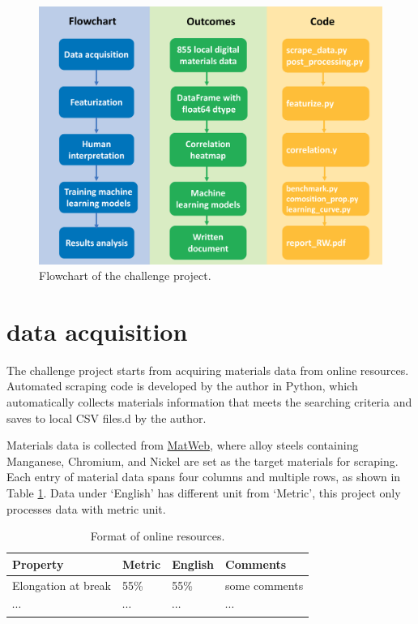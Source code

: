 \documentclass[10pt,aps,prb,amsmath,amssymb,twocolumn,letterpaper,nobalancelastpage,final,citeautoscript,floatfix,raggedbottom,superscriptaddress]{revtex4-1}
\begin{document}
\begin{figure}[h]
  \center
  \vspace{-1mm}
 \includegraphics[width=0.95\linewidth]{figures/flowchart.png}
  \caption{Flowchart of the challenge project.}
  \label{fig:flowchart}
\end{figure}




\section{data acquisition}

The challenge project starts from acquiring materials data from online resources. Automated scraping code is developed by the author in Python, which automatically collects materials information that meets the searching criteria and saves to local CSV files.d by the author. 

Materials data is collected from \href{http://www.matweb.com/index.aspx}{MatWeb}, where alloy steels containing Manganese, Chromium, and Nickel are set as the target materials for scraping. Each entry of material data spans four columns and multiple rows, as shown in Table \ref{tab:web_data}. Data under `English' has different unit from `Metric', this project only processes data with metric unit.

\vspace{-10pt}
\begin{table}[h]
\begin{ruledtabular}
\caption{Format of online resources.\label{tab:web_data}}\centering
\begin{tabular}{llll}
\sffamily Property & \sffamily Metric & \sffamily English &  \sffamily Comments \\
\hline 
Elongation at break & 55\% & 55\% & some comments \\
\hline
$\cdots$ & $\cdots$ & $\cdots$ & $\cdots$
\end{tabular}
\end{ruledtabular}
\end{table}
\end{document}
